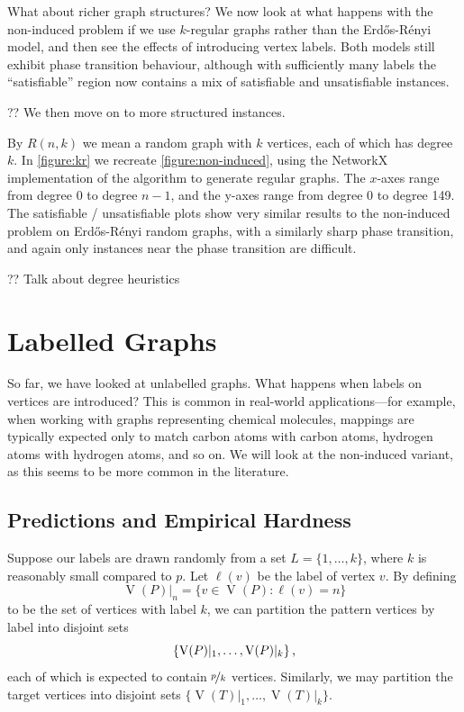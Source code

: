 \documentclass[twoside,11pt]{article}
\newcommand{\citet}[1]{\citeA{#1}}
\newcommand{\citep}[1]{\cite{#1}}
\begin{document}
What about richer graph structures? We now look at what happens with the non-induced problem if we
use $k$-regular graphs rather than the Erd\H{o}s-R\'enyi model, and then see the effects of
introducing vertex labels. Both models still exhibit phase transition behaviour, although with
sufficiently many labels the ``satisfiable'' region now contains a mix of satisfiable and
unsatisfiable instances.

?? We then move on to more structured instances.

By $R(n, k)$ we mean a random graph with $k$ vertices, each of which has degree $k$. In
\cref{figure:kr} we recreate \cref{figure:non-induced}, using the NetworkX implementation
\citep{o:NetworkX} of the \citet{DBLP:journals/cpc/StegerW99} algorithm to generate regular graphs.
The $x$-axes range from degree 0 to degree $n - 1$, and the y-axes range from degree 0 to degree
149.  The satisfiable / unsatisfiable plots show very similar results to the non-induced problem on
Erd\H{o}s-R\'enyi random graphs, with a similarly sharp phase transition, and
again only instances near the phase transition are difficult.

?? Talk about degree heuristics

\section{Labelled Graphs}\label{section:labelled}

So far, we have looked at unlabelled graphs. What happens when labels on vertices are introduced?
This is common in real-world applications---for example, when working with graphs representing
chemical molecules, mappings are typically expected only to match carbon atoms with carbon atoms,
hydrogen atoms with hydrogen atoms, and so on.  We will look at the non-induced variant, as this
seems to be more common in the literature.

\subsection{Predictions and Empirical Hardness}

Suppose our labels are drawn randomly from a set $L = \{ 1, \ldots, k \}$, where $k$ is reasonably
small compared to $p$. Let $\ell(v)$ be the label of vertex $v$. By defining \[
    \operatorname{V}(P)\vert_n = \{ v \in \operatorname{V}(P) : \ell(v) = n \} \] to be the set of
vertices with label $k$, we can partition the pattern vertices by label into disjoint sets \[\{
    \operatorname{V}(P)\vert_1, \ldots, \operatorname{V}(P)\vert_k \}\textnormal{\,,}\] each of
which is expected to contain $\nicefrac{p}{k}$ vertices. Similarly, we may partition the target
vertices into disjoint sets $\{ \operatorname{V}(T)\vert_1, \ldots, \operatorname{V}(T)\vert_k \}$.
\end{document}
